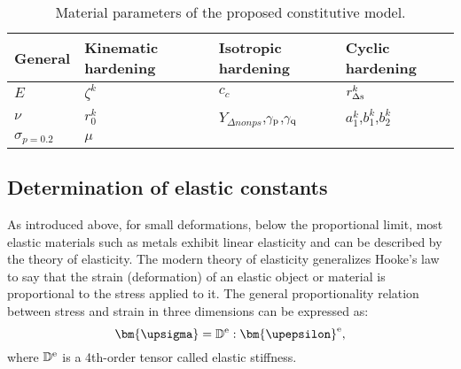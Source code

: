 \begin{table}[htbp]
  \centering
  \caption{Material parameters of the proposed constitutive model.}
    \begin{tabular}{llll}
    \toprule
    General & Kinematic hardening & Isotropic hardening & Cyclic hardening \\
    \midrule
    $E$   & $\zeta^k$ & $c_c$ & $r_{\Delta \rm{s}}^k$ \\
    $\nu$ & $r_0^k$ & $Y_{\Delta nonps}$,$\gamma_{\rm{p}}$,$\gamma_{\rm{q}}$ & $a_1^k$,$b_1^k$,$b_2^k$ \\
    $\sigma_{p=0.2}$ & $\mu$ &  & \\
    \bottomrule
    \end{tabular}%
  \label{tab:ParametersCollection}%
\end{table}%


\subsection{Determination of elastic constants}
As introduced above, for small deformations, below the proportional limit, most elastic materials such as metals exhibit linear elasticity and can be described by the theory of elasticity.
The modern theory of elasticity generalizes Hooke's law to say that the strain (deformation) of an elastic object or material is proportional to the stress applied to it.
The general proportionality relation between stress and strain in three dimensions can be expressed as:
\begin{equation}
{\bm{\upsigma }} = {\mathbb{D}^{\rm{e}}}:{{\bm{\upepsilon }}^{\rm{e}}},
\label{Equ:HookesLaw}
\end{equation}
where ${\mathbb{D}^{\rm{e}}}$ is a 4th-order tensor called elastic stiffness.

